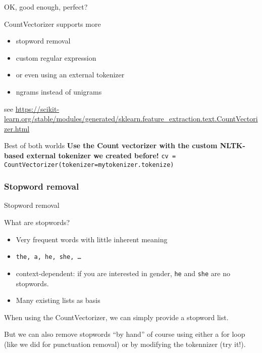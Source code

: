 \begin{frame}{OK, good enough, perfect?}
  \begin{block}{CountVectorizer supports more}
	  \begin{itemize}
	  \item stopword removal
	  \item custom regular expression
	  \item or even using an external tokenizer
	  \item ngrams instead of unigrams
	  \end{itemize}
  \end{block}
  \tiny{see \url{https://scikit-learn.org/stable/modules/generated/sklearn.feature\_extraction.text.CountVectorizer.html}}

\pause
\begin{alertblock}{Best of both worlds}
  \textbf{Use the Count vectorizer with the custom NLTK-based external tokenizer we created before!}
  \texttt{cv = CountVectorizer(tokenizer=mytokenizer.tokenize)}
\end{alertblock}
\end{frame}



\subsubsection{Stopword removal}



\begin{frame}{Stopword removal}
	\begin{block}{What are stopwords?}
		\begin{itemize}
			\item Very frequent words with little inherent meaning
			\item \texttt{the, a, he, she, \ldots}
			\item context-dependent: if you are interested in gender, \texttt{he} and \texttt{she} are no stopwords. 
			\item Many existing lists as basis
		\end{itemize}
	\end{block}

When using the CountVectorizer, we can simply provide a stopword list. 

But we can also remove stopwords ``by hand'' of course using either a for loop (like we did for punctuation removal) or by modifying the tokennizer (try it!).
\end{frame}




